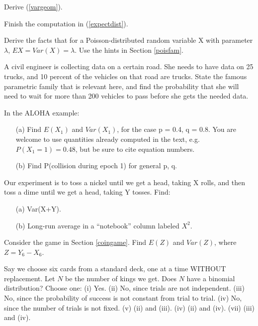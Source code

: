 \oneproblem
Derive (\ref{vargeom}).

\oneproblem
Finish the computation in (\ref{expectdist}).

\oneproblem
Derive the facts that for a Poisson-distributed random variable X with
parameter $\lambda$, $EX = Var(X) = \lambda$.  Use the hints in Section
\ref{poisfam}.

\oneproblem
A civil engineer is collecting data on a certain road.  She needs to
have data on 25 trucks, and 10 percent of the vehicles on that road are
trucks.  State the famous parametric family that is relevant here, and
find the probability that she will need to wait for more than
200 vehicles to pass before she gets the needed data.

\oneproblem
In the ALOHA example:

\begin{itemize}

\item [(a)] Find $E(X_1)$ and $Var(X_1)$, for the case p = 0.4, q = 0.8.
You are welcome to use quantities already computed in the text, e.g.
$P(X_1 = 1) = 0.48$, but be sure to cite equation numbers.

\item [(b)] Find P(collision during epoch 1) for general p, q.

\end{itemize}

\oneproblem
Our experiment is to toss a nickel until we get a head, taking
X rolls, and then toss a dime until we get a head, taking Y tosses.
Find:

\begin{itemize}

\item [(a)] Var(X+Y).

\item [(b)] Long-run average in a ``notebook'' column labeled $X^2$.

\end{itemize}

\oneproblem
Consider the game in Section \ref{coingame}.  Find $E(Z)$ and $Var(Z)$,
where $Z = Y_6 - X_6$.

\oneproblem
Say we choose six cards from a standard deck, one at a time WITHOUT
replacement.  Let $N$ be the number of kings we get.  Does $N$ have a
binomial distribution?  Choose one: (i)  Yes.  (ii) No, since trials are
not independent.  (iii) No, since the probability of success is not
constant from trial to trial.  (iv) No, since the number of trials is not
fixed.  (v) (ii) and (iii).  (iv) (ii) and (iv).  (vii) (iii) and (iv).  

